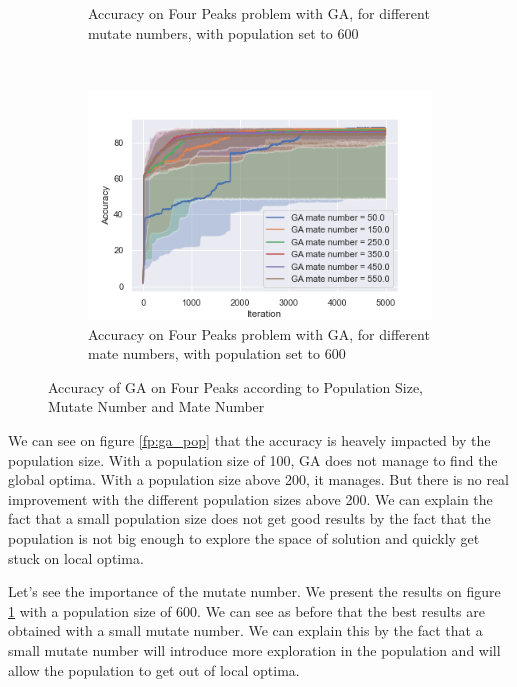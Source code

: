 \documentclass[twocolumn, 10pt]{article}
\begin{document}
\begin{figure}[h]
\begin{subfigure}[t]{0.32\columnwidth}
						\caption{Accuracy on Four Peaks problem with GA, for different mutate numbers, with population set to 600}
						\label{fp:ga_mutate}
					\end{subfigure}
					~
					\begin{subfigure}[t]{0.32\columnwidth}
						\centering
						\includegraphics[width=\linewidth]{../graphics/four_peaks_GA_Iteration_Error_GA_mate_number.png}
						\caption{Accuracy on Four Peaks problem with GA, for different mate numbers, with population set to 600}
						\label{fp:ga_mate}
					\end{subfigure}
					\caption{Accuracy of GA on Four Peaks according to Population Size, Mutate Number and Mate Number}
					\label{fp:ga}
				\end{figure}

				We can see on figure \ref{fp:ga_pop} that the accuracy is heavely impacted by the population size. With a population size of 100, GA does not manage to find the global optima. With a population size above 200, it manages. But there is no real improvement with the different population sizes above 200. We can explain the fact that a small population size does not get good results by the fact that the population is not big enough to explore the space of solution and quickly get stuck on local optima.

				Let's see the importance of the mutate number. We present the results on figure \ref{fp:ga_mutate} with a population size of 600. We can see as before that the best results are obtained with a small mutate number. We can explain this by the fact that a small mutate number will introduce more exploration in the population and will allow the population to get out of local optima.
\end{document}
